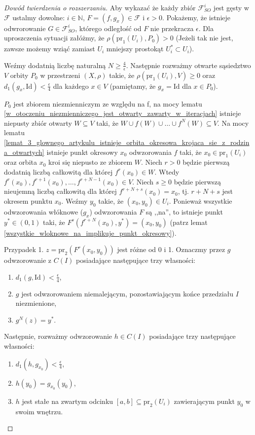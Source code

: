 \documentclass[licencjacka]{pwr_wmat_praca_dyplomowa}
\theoremstyle{plain}
\numberwithin{theorem}{chapter}
\theoremstyle{definition}
\numberwithin{theorem}{chapter}
\begin{document}
\begin{proof}[Dowód twierdzenia o rozszerzaniu]
Aby wykazać że każdy zbiór $\mathcal{F}_{SO}^i$ jest gęsty w $\mathcal{F}$ ustalmy dowolne: $i \in \mathbb{N}$, $F=(f,g_x) \in \mathcal{F}$ i $\epsilon > 0$. Pokażemy, że istnieje odwrorowanie $G \in \mathcal{F}_{SO}^i$, którego odległość od $F$ nie przekracza $\epsilon$. Dla uproszczenia sytuacji załóżmy, że $\rho(\textrm{pr}_1(U_i), P_0) > 0$ (Jeżeli tak nie jest, zawsze możemy wziąć zamiast $U_i$ mniejszy prostokąt $U_i^* \subset U_i$).

Weźmy dodatnią liczbę naturalną $N \geq \frac{4}{\epsilon}$. Następnie rozważmy otwarte sąsiedztwo $V$ orbity $P_0$ w przestrzeni $(X, \rho)$ takie, że $\rho(\textrm{pr}_1(U_i), V) \geq 0$ oraz $d_1(g_x, \textrm{Id}) < \frac{\epsilon}{4}$ dla każdego $x \in V$ (pamiętamy, że $g_x = \textrm{Id}$ dla $x \in P_0$).

$P_0$ jest zbiorem niezmienniczym ze względu na f, na mocy lematu \ref{w_otoczeniu_niezmienniczego_jest_otwarty_zawarty_w_iteracjach} istnieje niepusty zbiór otwarty $W \subseteq V$ taki, że $W \cup f(W) \cup \ldots \cup f^N(W) \subseteq V$. Na mocy lematu \ref{lemat_3_glownego_artykulu_istnieje_orbita_okresowa_krojaca_sie_z_rodzina_otwartych} istnieje punkt okresowy $x_0$ odwzorowania $f$ taki, że $x_0 \in \textrm{pr}_1(U_i)$ oraz orbita $x_0$ kroi się niepusto ze zbiorem $W$. Niech $r > 0$ będzie pierwszą dodatnią liczbą całkowitą dla której $f^r(x_0) \in W$. Wtedy $f^r(x_0), f^{r+1}(x_0), \ldots, f^{r+N-1}(x_0) \in V$. Niech $s \geq 0$ będzie pierwszą nieujemną liczbą całkowitą dla której $f^{r+N+s}(x_0) = x_0$, tj. $r+N+s$ jest okresem punktu $x_0$. Weźmy $y_0$ takie, że $(x_0, y_0) \in U_i$. Ponieważ wszystkie odwzorowania włóknowe ($g_x$) odwzorowania $F$ są ,,na'', to istnieje punkt $y^* \in (0,1)$ taki, że $F^s(f^{r+N}(x_0), y^*) = (x_0, y_0)$ (patrz lemat \ref{wszystkie_wloknowe_na_implikuje_punkt_okresowy}).

Przypadek 1. $z = \textrm{pr}_2(F^r(x_0, y_0))$ jest różne od 0 i 1.
Oznaczmy przez $g$ odwzorowanie z $C(I)$ posiadające następujące trzy własności:
\begin{enumerate}[label=(g\arabic*)]
\item \label{g_jeden} $d_1(g, \mathrm{Id}) < \frac{\epsilon}{4}$,
\item \label{g_dwa} $g$ jest odwzorowaniem niemalejącym, pozostawiającym końce przedziału $I$ niezmienione,
\item \label{g_trzy} $g^N(z) = y^*$.
\end{enumerate}

Następnie, rozważmy odwzorowanie $h \in C(I)$ posiadające trzy następujące własności:
\begin{enumerate}[label=(h\arabic*)]
\item \label{h_jeden} $d_1(h, g_{x_0}) < \frac{\epsilon}{4}$,
\item \label{h_dwa} $h(y_0) = g_{x_0}(y_0)$,
\item \label{h_trzy} $h$ jest stałe na zwartym odcinku $[a,b] \subseteq \textrm{pr}_2(U_i)$ zawierającym punkt $y_0$ w swoim wnętrzu.
\end{enumerate}


\end{proof}
\end{document}
